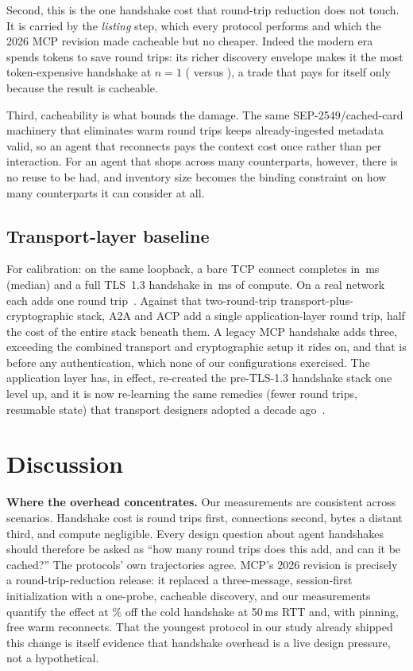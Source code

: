 \documentclass[10pt]{article}
\begin{document}
Second, this is the one handshake cost that round-trip reduction does not
touch. It is carried by the \emph{listing} step, which every protocol
performs and which the 2026 MCP revision made cacheable but no cheaper.
Indeed the modern era spends tokens to save round trips: its richer
discovery envelope makes it the most token-expensive handshake at $n{=}1$
(\TokMcpModern{} versus \TokMcpLegacy{}), a trade that pays for itself
only because the result is cacheable.

Third, cacheability is what bounds the damage. The same
SEP-2549/cached-card machinery that eliminates warm round trips keeps
already-ingested metadata valid, so an agent that reconnects pays the
context cost once rather than per interaction. For an agent that shops
across many counterparts, however, there is no reuse to be had, and
inventory size becomes the binding constraint on how many counterparts it
can consider at all.

\subsection{Transport-layer baseline}
\label{sec:results-baseline}

For calibration: on the same loopback, a bare TCP connect completes in
\BaselineTcpMed{}\,ms (median) and a full TLS~1.3 handshake in
\BaselineTlsMed{}\,ms of compute. On a real network each adds one round
trip~\citep{rescorla2018tls}. Against that two-round-trip
transport-plus-cryptographic stack, A2A and ACP add a single
application-layer round trip, half the cost of the entire stack beneath
them. A legacy MCP handshake adds three, exceeding the combined transport
and cryptographic setup it rides on, and that is before any
authentication, which none of our configurations exercised. The
application layer has, in effect, re-created the pre-TLS-1.3 handshake
stack one level up, and it is now re-learning the same remedies (fewer
round trips, resumable state) that transport designers adopted a decade
ago~\citep{lee2021tls,iyengar2021quic}.


\section{Discussion}
\label{sec:discussion}

\textbf{Where the overhead concentrates.} Our measurements are consistent
across scenarios. Handshake cost is round trips first, connections
second, bytes a distant third, and compute negligible. Every design
question about agent handshakes should therefore be asked as ``how many
round trips does this add, and can it be cached?'' The protocols' own
trajectories agree. MCP's 2026 revision is precisely a
round-trip-reduction release: it replaced a three-message, session-first
initialization with a one-probe, cacheable discovery, and our
measurements quantify the effect at \McpModernSpeedup{}\% off the cold
handshake at 50\,ms RTT and, with pinning, free warm reconnects. That the
youngest protocol in our study already shipped this change is itself
evidence that handshake overhead is a live design pressure, not a
hypothetical.
\end{document}
